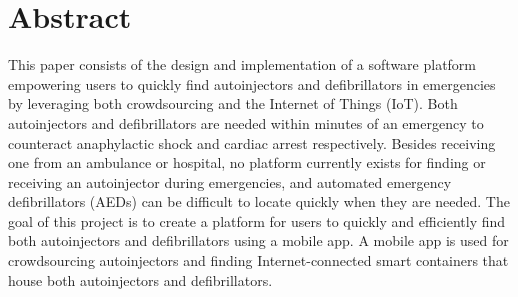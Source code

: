 \section*{Abstract}

\onehalfspacing

This paper consists of the design and implementation of a software platform empowering users to quickly find autoinjectors and defibrillators in emergencies by leveraging both crowdsourcing and the Internet of Things (IoT). Both autoinjectors and defibrillators are needed within minutes of an emergency to counteract anaphylactic shock and cardiac arrest respectively. Besides receiving one from an ambulance or hospital, no platform currently exists for finding or receiving an autoinjector during emergencies, and automated emergency defibrillators (AEDs) can be difficult to locate quickly when they are needed. The goal of this project is to create a platform for users to quickly and efficiently find both autoinjectors and defibrillators using a mobile app. A mobile app is used for crowdsourcing autoinjectors and finding Internet-connected smart containers that house both autoinjectors and defibrillators.
